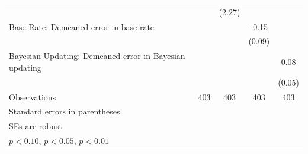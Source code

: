 \begin{table}[htbp]
\begin{tabular}{l*{4}{c}}
                &                  &   (2.27)         &                  &                  \\
Base Rate: Demeaned error in base rate&                  &                  &    -0.15\sym{*}  &                  \\
                &                  &                  &   (0.09)         &                  \\
Bayesian Updating: Demeaned error in Bayesian updating&                  &                  &                  &     0.08         \\
                &                  &                  &                  &   (0.05)         \\
\hline
Observations    &      403         &      403         &      403         &      403         \\
\hline\hline
\multicolumn{5}{l}{\footnotesize Standard errors in parentheses}\\
\multicolumn{5}{l}{\footnotesize SEs are robust}\\
\multicolumn{5}{l}{\footnotesize \sym{*} \(p<0.10\), \sym{**} \(p<0.05\), \sym{***} \(p<0.01\)}\\
\end{tabular}
\end{table}
